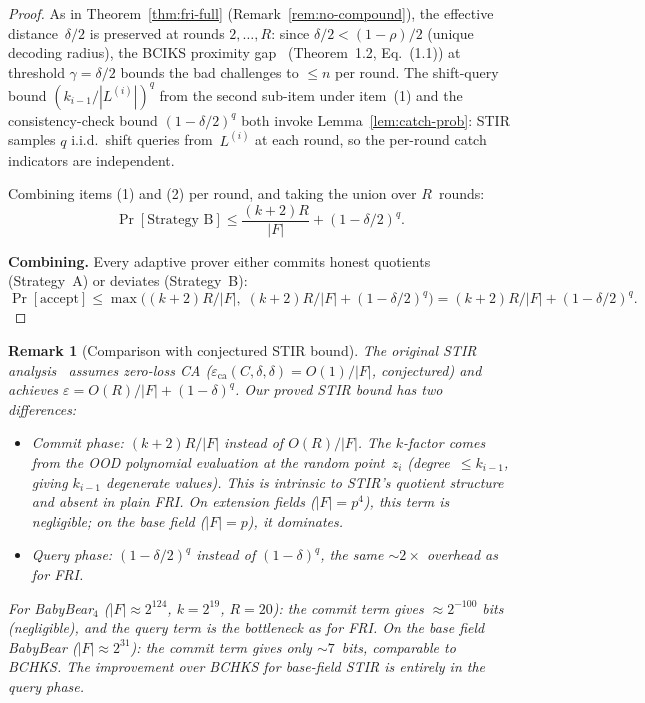 \documentclass[11pt]{article}
\newtheorem{remark}[theorem]{Remark}
\begin{document}
\begin{proof}
As in Theorem~\ref{thm:fri-full} (Remark~\ref{rem:no-compound}), the effective distance~$\delta/2$ is preserved at rounds $2, \ldots, R$: since $\delta/2 < (1{-}\rho)/2$ (unique decoding radius), the BCIKS proximity gap~\cite{BCIKS} (Theorem~1.2, Eq.~(1.1)) at threshold $\gamma = \delta/2$ bounds the bad challenges to $\leq n$ per round. The shift-query bound $(k_{i-1}/|L^{(i)}|)^q$ from the second sub-item under item~(1) and the consistency-check bound $(1{-}\delta/2)^q$ both invoke Lemma~\ref{lem:catch-prob}: STIR samples $q$ i.i.d.\ shift queries from~$L^{(i)}$ at each round, so the per-round catch indicators are independent.

Combining items (1) and (2) per round, and taking the union over $R$~rounds:
$$\Pr[\text{Strategy B}] \leq \frac{(k+2)R}{|F|} + (1 - \delta/2)^q.$$

\textbf{Combining.} Every adaptive prover either commits honest quotients (Strategy~A) or deviates (Strategy~B):
$$\Pr[\text{accept}] \leq \max\!\big((k{+}2)R/|F|,\; (k{+}2)R/|F| + (1{-}\delta/2)^q\big) = (k{+}2)R/|F| + (1{-}\delta/2)^q.$$
\end{proof}

\begin{remark}[Comparison with conjectured STIR bound]
\label{rem:stir-comparison}
The original STIR analysis~\cite{STIR} assumes zero-loss CA ($\varepsilon_{\mathrm{ca}}(C, \delta, \delta) = O(1)/|F|$, conjectured) and achieves $\varepsilon = O(R)/|F| + (1 - \delta)^q$. Our proved STIR bound has two differences:
\begin{itemize}[nosep]
\item \emph{Commit phase}: $(k{+}2)R/|F|$ instead of $O(R)/|F|$. The $k$-factor comes from the OOD polynomial evaluation at the random point~$z_i$ (degree~$\leq k_{i-1}$, giving $k_{i-1}$ degenerate values). This is intrinsic to STIR's quotient structure and absent in plain FRI. On extension fields ($|F| = p^4$), this term is negligible; on the base field ($|F| = p$), it dominates.
\item \emph{Query phase}: $(1-\delta/2)^q$ instead of $(1-\delta)^q$, the same ${\sim}2\times$ overhead as for FRI.
\end{itemize}
For BabyBear$_4$ ($|F| \approx 2^{124}$, $k = 2^{19}$, $R = 20$): the commit term gives $\approx 2^{-100}$ bits (negligible), and the query term is the bottleneck as for FRI. On the base field BabyBear ($|F| \approx 2^{31}$): the commit term gives only ${\sim} 7$~bits, comparable to BCHKS. The improvement over BCHKS for base-field STIR is entirely in the query phase.
\end{remark}
\end{document}
